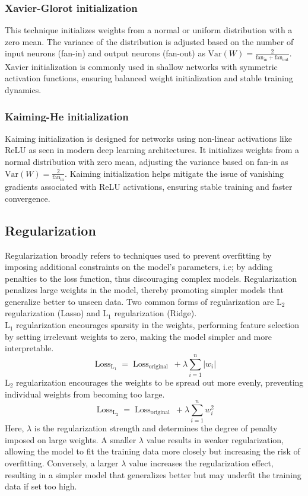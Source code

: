 \subsubsection{Xavier-Glorot initialization}
This technique \cite{glorot} initializes weights from a normal or uniform distribution with a zero mean. The variance of the distribution is adjusted based on the number of input neurons (fan-in) and output neurons (fan-out) as $\text{Var}(W) = \frac{2}{\text{fan}_{\text{in}} + \text{fan}_{\text{out}}}$. Xavier initialization is commonly used in shallow networks with symmetric activation functions, ensuring balanced weight initialization and stable training dynamics. 
\subsubsection{Kaiming-He initialization}
Kaiming initialization \cite{he2015} is designed for networks using non-linear activations like ReLU as seen in modern deep learning architectures. It initializes weights from a normal distribution with zero mean, adjusting the variance based on fan-in as $ \text{Var}(W) = \frac{2}{\text{fan}_{\text{in}}}$. Kaiming initialization helps mitigate the issue of vanishing gradients associated with \gls{ReLU} activations, ensuring stable training and faster convergence.
\subsection{Regularization}
Regularization broadly refers to techniques used to prevent overfitting by imposing additional constraints on the model's parameters, i.e; by adding penalties to the loss function, thus discouraging complex models. Regularization penalizes large weights in the model, thereby promoting simpler models that generalize better to unseen data. Two common forms of regularization are L$_2$ regularization (Lasso) and L$_1$ regularization (Ridge). \\
L$_1$ regularization encourages sparsity in the weights, performing feature selection by setting irrelevant weights to zero, making the model simpler and more interpretable. 
\[ \operatorname{Loss}_{\mathrm{L}_1}=\operatorname{Loss}_{\text {original }}+\lambda \sum_{i=1}^n\left|w_i\right| \]
L$_2$ regularization encourages the weights to be spread out more evenly, preventing individual weights from becoming too large.
\[ \operatorname{Loss}_{\mathrm{L}_2}=\operatorname{Loss}_{\text {original }}+\lambda \sum_{i=1}^n w^2_i \]
Here, $\lambda$ is the regularization strength and determines the degree of penalty imposed on large weights. A smaller $\lambda$ value results in weaker regularization, allowing the model to fit the training data more closely but increasing the risk of overfitting. Conversely, a larger $\lambda$ value increases the regularization effect, resulting in a simpler model that generalizes better but may underfit the training data if set too high.
